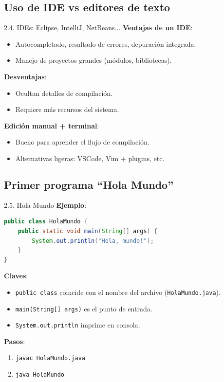 \documentclass{beamer}
\begin{document}
\subsection{Uso de IDE vs editores de texto}

\begin{frame}{2.4. IDEs: Eclipse, IntelliJ, NetBeans...}
\textbf{Ventajas de un IDE}:
\begin{itemize}
  \item Autocompletado, resaltado de errores, depuración integrada.
  \item Manejo de proyectos grandes (módulos, bibliotecas).
\end{itemize}

\textbf{Desventajas}:
\begin{itemize}
  \item Ocultan detalles de compilación.
  \item Requiere más recursos del sistema.
\end{itemize}

\textbf{Edición manual + terminal}:
\begin{itemize}
  \item Bueno para aprender el flujo de compilación.
  \item Alternativas ligeras: VSCode, Vim + plugins, etc.
\end{itemize}
\end{frame}

\subsection{Primer programa “Hola Mundo”}

\begin{frame}[fragile]{2.5. Hola Mundo}
\textbf{Ejemplo}:
\begin{lstlisting}[language=Java]
public class HolaMundo {
    public static void main(String[] args) {
        System.out.println("Hola, mundo!");
    }
}
\end{lstlisting}

\textbf{Claves}:
\begin{itemize}
  \item \texttt{public class} coincide con el nombre del archivo (\texttt{HolaMundo.java}).
  \item \texttt{main(String[] args)} es el punto de entrada.
  \item \texttt{System.out.println} imprime en consola.
\end{itemize}

\textbf{Pasos}:
\begin{enumerate}
  \item \texttt{javac HolaMundo.java}
  \item \texttt{java HolaMundo}
\end{enumerate}
\end{frame}
\end{document}
